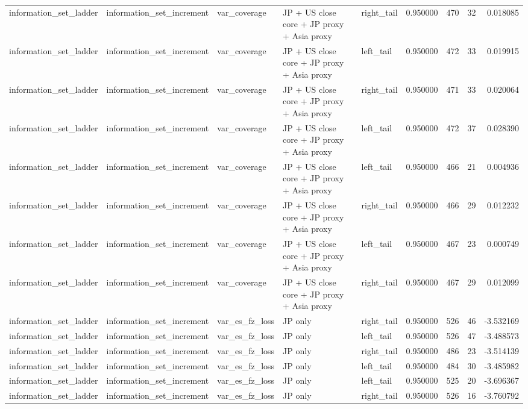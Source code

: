 \begin{tabular}{lllllrrrr}
information\_set\_ladder & information\_set\_increment & var\_coverage & JP + US close core + JP proxy + Asia proxy & right\_tail & 0.950000 & 470 & 32 & 0.018085 \\
information\_set\_ladder & information\_set\_increment & var\_coverage & JP + US close core + JP proxy + Asia proxy & left\_tail & 0.950000 & 472 & 33 & 0.019915 \\
information\_set\_ladder & information\_set\_increment & var\_coverage & JP + US close core + JP proxy + Asia proxy & right\_tail & 0.950000 & 471 & 33 & 0.020064 \\
information\_set\_ladder & information\_set\_increment & var\_coverage & JP + US close core + JP proxy + Asia proxy & left\_tail & 0.950000 & 472 & 37 & 0.028390 \\
information\_set\_ladder & information\_set\_increment & var\_coverage & JP + US close core + JP proxy + Asia proxy & left\_tail & 0.950000 & 466 & 21 & 0.004936 \\
information\_set\_ladder & information\_set\_increment & var\_coverage & JP + US close core + JP proxy + Asia proxy & right\_tail & 0.950000 & 466 & 29 & 0.012232 \\
information\_set\_ladder & information\_set\_increment & var\_coverage & JP + US close core + JP proxy + Asia proxy & left\_tail & 0.950000 & 467 & 23 & 0.000749 \\
information\_set\_ladder & information\_set\_increment & var\_coverage & JP + US close core + JP proxy + Asia proxy & right\_tail & 0.950000 & 467 & 29 & 0.012099 \\
information\_set\_ladder & information\_set\_increment & var\_es\_fz\_loss & JP only & right\_tail & 0.950000 & 526 & 46 & -3.532169 \\
information\_set\_ladder & information\_set\_increment & var\_es\_fz\_loss & JP only & left\_tail & 0.950000 & 526 & 47 & -3.488573 \\
information\_set\_ladder & information\_set\_increment & var\_es\_fz\_loss & JP only & right\_tail & 0.950000 & 486 & 23 & -3.514139 \\
information\_set\_ladder & information\_set\_increment & var\_es\_fz\_loss & JP only & left\_tail & 0.950000 & 484 & 30 & -3.485982 \\
information\_set\_ladder & information\_set\_increment & var\_es\_fz\_loss & JP only & left\_tail & 0.950000 & 525 & 20 & -3.696367 \\
information\_set\_ladder & information\_set\_increment & var\_es\_fz\_loss & JP only & right\_tail & 0.950000 & 526 & 16 & -3.760792 \\

\end{tabular}
